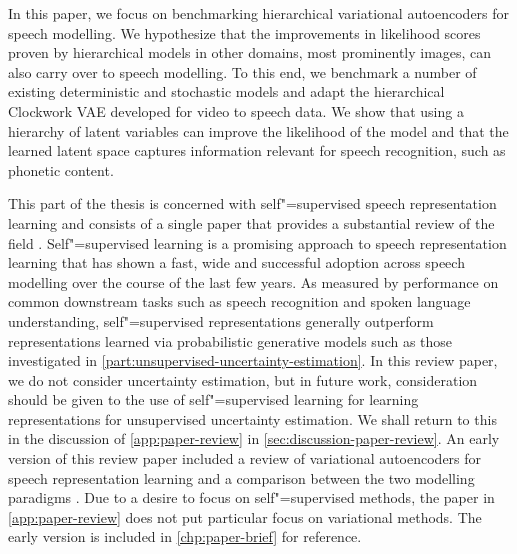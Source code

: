 In this paper, we focus on benchmarking hierarchical variational autoencoders for speech modelling. 
We hypothesize that the improvements in likelihood scores proven by hierarchical models in other domains, most prominently images, can also carry over to speech modelling. 
To this end, we benchmark a number of existing deterministic and stochastic models and adapt the hierarchical Clockwork VAE developed for video \parencite{saxena_clockwork_2021} to speech data. 
We show that using a hierarchy of latent variables can improve the likelihood of the model and that the learned latent space captures information relevant for speech recognition, such as phonetic content. 


This part of the thesis is concerned with self"=supervised speech representation learning and consists of a single paper that provides a substantial review of the field \parencite{mohamed_selfsupervised_2022}. 
Self"=supervised learning is a promising approach to speech representation learning that has shown a fast, wide and successful adoption across speech modelling over the course of the last few years. 
As measured by performance on common downstream tasks such as speech recognition and spoken language understanding, self"=supervised representations generally outperform representations learned via probabilistic generative models such as those investigated in \cref{part:unsupervised-uncertainty-estimation}. 
In this review paper, we do not consider uncertainty estimation, but in future work, consideration should be given to the use of self"=supervised learning for learning representations for unsupervised uncertainty estimation. 
We shall return to this in the discussion of \cref{app:paper-review} in \cref{sec:discussion-paper-review}.
An early version of this review paper included a review of variational autoencoders for speech representation learning and a comparison between the two modelling paradigms \parencite{borgholt_brief_2022}. 
Due to a desire to focus on self"=supervised methods, the paper in \cref{app:paper-review} does not put particular focus on variational methods. 
The early version is included in \cref{chp:paper-brief} for reference.

